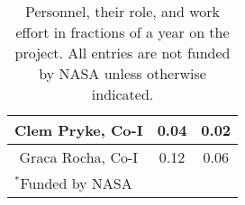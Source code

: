 \begin{table}[h]
\begin{center}
\begin{tabular}{|c|c|c|}
Clem Pryke, Co-I             & 0.04 & 0.02   \\ \hline
Graca Rocha, Co-I            & 0.12 & 0.06   \\ \hline
\multicolumn{3}{|l|}{\small $^{*}$Funded by NASA} \\  \hline 
\end{tabular}
\end{center}
\vspace{-0.2in}
\caption{ Personnel, their role, and work effort in fractions of a year on the project.  All entries are not funded 
by NASA unless otherwise indicated. 
\label{tab:personnel} }
\end{table}


%
